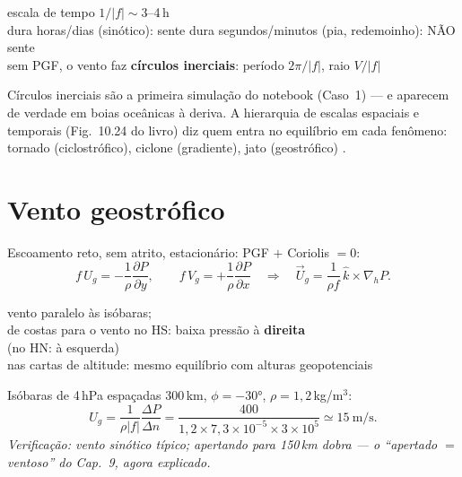 \documentclass[11pt]{article}
\begin{document}
\begin{noquadro}
escala de tempo $1/|f| \sim 3$--4\,h\\
dura horas/dias (sinótico): sente \quad dura segundos/minutos (pia,
redemoinho): NÃO sente\\[2pt]
sem PGF, o vento faz \textbf{círculos inerciais}: período
$2\pi/|f|$, raio $V/|f|$
\end{noquadro}

Círculos inerciais são a primeira simulação do notebook (Caso~1) — e
aparecem de verdade em boias oceânicas à deriva. A hierarquia de escalas
espaciais e temporais (Fig.~10.24 do livro) diz quem entra no equilíbrio
em cada fenômeno: tornado (ciclostrófico), ciclone (gradiente), jato
(geostrófico) .

\section{Vento geostrófico}\label{sec:geo}


\begin{formadif}
Escoamento reto, sem atrito, estacionário: PGF $+$ Coriolis $= 0$:
\[ f\,U_g = -\frac{1}{\rho}\frac{\partial P}{\partial y},\qquad
   f\,V_g = +\frac{1}{\rho}\frac{\partial P}{\partial x}
\quad\Longrightarrow\quad
\vec U_g = \frac{1}{\rho f}\,\hat k\times\nabla_h P. \]
\end{formadif}

\begin{noquadro}
vento paralelo às isóbaras;\\
de costas para o vento no HS: baixa pressão à \textbf{direita}\\
(no HN: à esquerda)\\[2pt]
nas cartas de altitude: mesmo equilíbrio com alturas geopotenciais
\end{noquadro}

\begin{exemplo}
Isóbaras de 4\,hPa espaçadas 300\,km, $\phi = -30°$,
$\rho = 1{,}2$\,kg/m$^3$:
\[ U_g = \frac{1}{\rho|f|}\frac{\Delta P}{\Delta n}
 = \frac{400}{1{,}2\times7{,}3\times10^{-5}\times3\times10^{5}}
 \simeq 15\ \mathrm{m/s}. \]
\emph{Verificação: vento sinótico típico; apertando para 150\,km dobra —
o ``apertado $=$ ventoso'' do Cap.~9, agora explicado.}
\end{exemplo}
\end{document}
